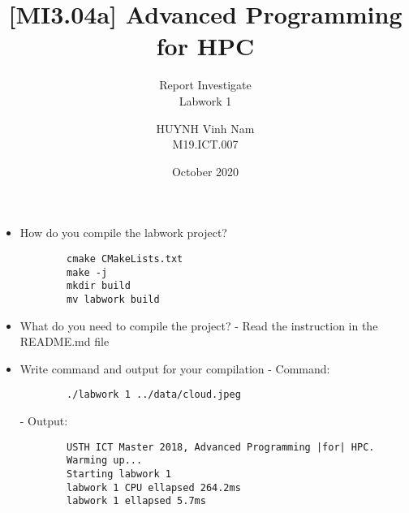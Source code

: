 \documentclass[10pt, a4paper]{article}
\title{[MI3.04a] Advanced Programming for HPC}
\subtitle{Report Investigate \\ Labwork 1}
\author{HUYNH Vinh Nam \\ M19.ICT.007}
\date{October 2020}
\begin{document}
\maketitle

\begin{itemize}
    \item How do you compile the labwork project? 
    \begin{verbatim}
        cmake CMakeLists.txt
        make -j
        mkdir build
        mv labwork build
    \end{verbatim}
    
    \item What do you need to compile the project? 
	\newline
	- Read the instruction in the README.md file
    
    \item Write command and output for your compilation
    - Command: 
    \begin{verbatim}
        ./labwork 1 ../data/cloud.jpeg
    \end{verbatim}
    - Output:
    \begin{verbatim}
        USTH ICT Master 2018, Advanced Programming |for| HPC. 
        Warming up... 
        Starting labwork 1
        labwork 1 CPU ellapsed 264.2ms
        labwork 1 ellapsed 5.7ms
        
    \end{verbatim}
    
\end{itemize}
\end{document}
